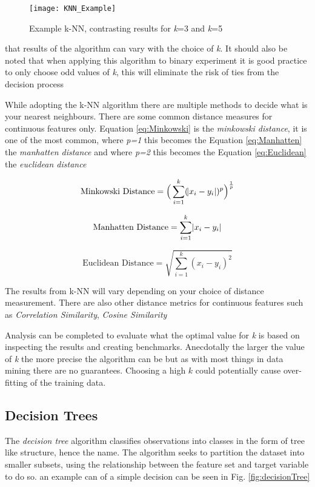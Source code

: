 \begin{figure}[H]
	\texttt{[image: KNN\_Example]}
	\caption{Example k-NN, contrasting results for \textit{k}=3 and \textit{k}=5 }
	\label{fig:KNN_Example}
\end{figure}

that results of the algorithm can vary with the choice of \textit{k}. It should also be noted that when applying this algorithm to binary experiment it is good practice to only choose odd values of \textit{k}, this will eliminate the risk of ties from the decision process \citep{keller_fuzzy_1985} 

While adopting the k-NN algorithm there are multiple methods to decide what is your nearest neighbours. There are some common distance measures for continuous features only. Equation \ref{eq:Minkowski} is the \textit{minkowski distance}, it is one of the most common, where \textit{p=1} this becomes the Equation \ref{eq:Manhatten} the \textit{manhatten distance} and where \textit{p=2} this becomes the Equation \ref{eq:Euclidean} the \textit{euclidean distance}

\begin{equation} \label{eq:Minkowski}
	\text{Minkowski Distance}   = \Big(\sum_{i=1}^k (\abs{x_i-y_i})^p\Big)^\frac{1}{p}
\end{equation}

\begin{equation} \label{eq:Manhatten}
	\text{Manhatten Distance}   = \sum_{i=1}^k \abs{x_i-y_i}
\end{equation}

\begin{equation} \label{eq:Euclidean}
	\text{Euclidean Distance}   = \sqrt{\sum_{i=1}^k (x_i-y_i)^2}
\end{equation}

The results from k-NN will vary depending on your choice of distance measurement. There are also other distance metrics for continuous features such as \textit{Correlation Similarity}, \textit{Cosine Similarity} \citep{sarwar_item-based_2001}

Analysis can be completed to evaluate what the optimal value for \textit{k} is based on inspecting the results and creating benchmarks. Anecdotally the larger the value of \textit{k} the more precise the algorithm can be but as with most things in data mining there are no guarantees. Choosing a high $k$ could potentially cause over-fitting of the training data.

\subsection{Decision Trees} \label{decTrees}
The \textit{decision tree} algorithm classifies observations into classes in the form of tree like structure, hence the name. The algorithm seeks to partition the dataset into smaller subsets, using the relationship between the feature set and target variable to do so. an example can of a simple decision can be seen in Fig. \ref{fig:decisionTree}

